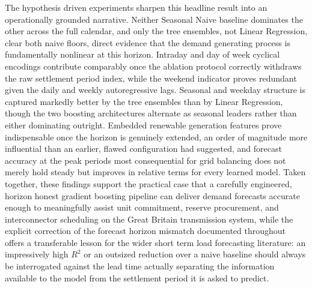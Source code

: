 \documentclass[runningheads]{llncs}
\begin{document}
The hypothesis driven experiments sharpen this headline result into an operationally grounded narrative. Neither Seasonal Naive baseline dominates the other across the full calendar, and only the tree ensembles, not Linear Regression, clear both naive floors, direct evidence that the demand generating process is fundamentally nonlinear at this horizon. Intraday and day of week cyclical encodings contribute comparably once the ablation protocol correctly withdraws the raw settlement period index, while the weekend indicator proves redundant given the daily and weekly autoregressive lags. Seasonal and weekday structure is captured markedly better by the tree ensembles than by Linear Regression, though the two boosting architectures alternate as seasonal leaders rather than either dominating outright. Embedded renewable generation features prove indispensable once the horizon is genuinely extended, an order of magnitude more influential than an earlier, flawed configuration had suggested, and forecast accuracy at the peak periods most consequential for grid balancing does not merely hold steady but improves in relative terms for every learned model. Taken together, these findings support the practical case that a carefully engineered, horizon honest gradient boosting pipeline can deliver demand forecasts accurate enough to meaningfully assist unit commitment, reserve procurement, and interconnector scheduling on the Great Britain transmission system, while the explicit correction of the forecast horizon mismatch documented throughout offers a transferable lesson for the wider short term load forecasting literature: an impressively high $R^2$ or an outsized reduction over a naive baseline should always be interrogated against the lead time actually separating the information available to the model from the settlement period it is asked to predict.
\end{document}
